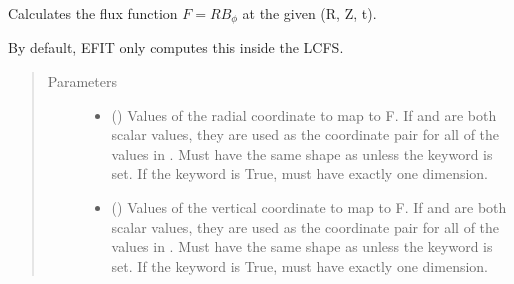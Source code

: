 \documentclass[letterpaper,10pt,english]{sphinxmanual}
\begin{document}
\begin{fulllineitems}
\begin{fulllineitems}
\begin{sphinxVerbatim}[commandchars=\\\{\}]
  \PYG{p}{[} \PYG{p}{]} \PYG{p}{[} \PYG{p}{]} 
\end{sphinxVerbatim}

\end{fulllineitems}


\begin{fulllineitems}
\label{\detokenize{eqtools:eqtools.core.Equilibrium.rz2F}}
Calculates the flux function \(F=RB_{\phi}\) at the given (R, Z, t).

By default, EFIT only computes this inside the LCFS.
\begin{quote}\begin{description}
\item[{Parameters}] \leavevmode\begin{itemize}
\item {} 
 () \textendash{} Values of the radial coordinate to
map to F. If  and  are both scalar values,
they are used as the coordinate pair for all of the values in
. Must have the same shape as  unless the 
keyword is set. If the  keyword is True,  must
have exactly one dimension.

\item {} 
 () \textendash{} Values of the vertical coordinate to
map to F. If  and  are both scalar values,
they are used as the coordinate pair for all of the values in
. Must have the same shape as  unless the 
keyword is set. If the  keyword is True,  must
have exactly one dimension.


\end{itemize}
\end{description}
\end{quote}
\end{fulllineitems}
\end{fulllineitems}
\end{document}
